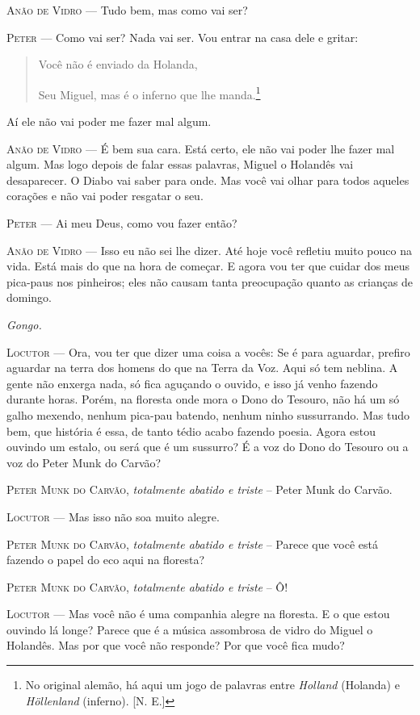 \textsc{Anão de Vidro} --- Tudo bem, mas como vai ser?

\textsc{Peter} --- Como vai ser? Nada vai ser. Vou entrar na casa dele e gritar:

\begin{quote}
Você não é enviado da Holanda,

Seu Miguel, mas é o inferno que lhe manda.\footnote{No original alemão,
  há aqui um jogo de palavras entre \emph{Holland} (Holanda) e
  \emph{Höllenland} (inferno). [N. E.]}
\end{quote}

Aí ele não vai poder me fazer mal algum.

\textsc{Anão de Vidro} --- É bem sua cara. Está certo, ele não vai poder lhe fazer
mal algum. Mas logo depois de falar essas palavras, Miguel o Holandês
vai desaparecer. O Diabo vai saber para onde. Mas você vai olhar para
todos aqueles corações e não vai poder resgatar o seu.

\textsc{Peter} --- Ai meu Deus, como vou fazer então?

\textsc{Anão de Vidro} --- Isso eu não sei lhe dizer. Até hoje você refletiu muito
pouco na vida. Está mais do que na hora de começar. E agora vou ter que
cuidar dos meus pica-paus nos pinheiros; eles não causam tanta
preocupação quanto as crianças de domingo.

\emph{Gongo.}

\textsc{Locutor} --- Ora, vou ter que dizer uma coisa a vocês: Se é para aguardar,
prefiro aguardar na terra dos homens do que na Terra da Voz. Aqui só tem
neblina. A gente não enxerga nada, só fica aguçando o ouvido, e isso já
venho fazendo durante horas. Porém, na floresta onde mora o Dono do
Tesouro, não há um só galho mexendo, nenhum pica-pau batendo, nenhum
ninho sussurrando. Mas tudo bem, que história é essa, de tanto tédio
acabo fazendo poesia. Agora estou ouvindo um estalo, ou será que é um
sussurro? É a voz do Dono do Tesouro ou a voz do Peter Munk do Carvão?

\textsc{Peter Munk do Carvão}, \emph{totalmente abatido e triste} -- Peter Munk
do Carvão.

\textsc{Locutor} --- Mas isso não soa muito alegre.

\textsc{Peter Munk do Carvão}, \emph{totalmente abatido e triste} -- Parece que
você está fazendo o papel do eco aqui na floresta?

\textsc{Peter Munk do Carvão}, \emph{totalmente abatido e triste} -- Ô!

\textsc{Locutor} --- Mas você não é uma companhia alegre na floresta. E o que
estou ouvindo lá longe? Parece que é a música assombrosa de vidro do
Miguel o Holandês. Mas por que você não responde? Por que você fica
mudo?

